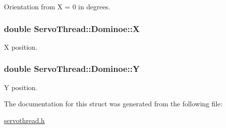 Orientation from X = 0 in degrees. 

\hypertarget{a00002_a8caa44969c79e0e46576da349957975b}{}
\subsubsection[{X}]{\setlength{\rightskip}{0pt plus 5cm}double Servo\+Thread\+::\+Dominoe\+::\+X}\label{a00002_a8caa44969c79e0e46576da349957975b}


X position. 

\hypertarget{a00002_ae7711996c8204586b6d8a5e657c4b06a}{}
\subsubsection[{Y}]{\setlength{\rightskip}{0pt plus 5cm}double Servo\+Thread\+::\+Dominoe\+::\+Y}\label{a00002_ae7711996c8204586b6d8a5e657c4b06a}


Y position. 



The documentation for this struct was generated from the following file\+:\begin{DoxyCompactItemize}
\item 
\hyperlink{a00021}{servothread.\+h}\end{DoxyCompactItemize}
